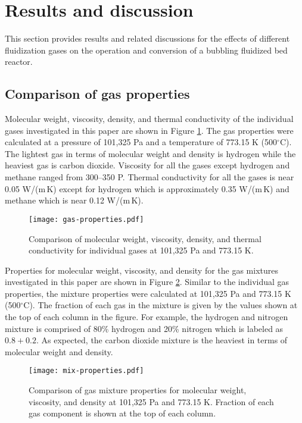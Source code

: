 
\section{Results and discussion}

This section provides results and related discussions for the effects of different fluidization gases on the operation and conversion of a bubbling fluidized bed reactor.

\subsection{Comparison of gas properties}

Molecular weight, viscosity, density, and thermal conductivity of the individual gases investigated in this paper are shown in Figure \ref{fig:gas-properties}. The gas properties were calculated at a pressure of 101,325 Pa and a temperature of 773.15 K (500$^\circ$C). The lightest gas in terms of molecular weight and density is hydrogen while the heaviest gas is carbon dioxide. Viscosity for all the gases except hydrogen and methane ranged from 300--350 \textmugreek P. Thermal conductivity for all the gases is near 0.05 W/(m\,K) except for hydrogen which is approximately 0.35 W/(m\,K) and methane which is near 0.12 W/(m\,K).

\begin{figure}[H]
    \centering
    \texttt{[image: gas-properties.pdf]}
    \caption{Comparison of molecular weight, viscosity, density, and thermal conductivity for individual gases at 101,325 Pa and 773.15 K.}
    \label{fig:gas-properties}
\end{figure}

Properties for molecular weight, viscosity, and density for the gas mixtures investigated in this paper are shown in Figure \ref{fig:mix-properties}. Similar to the individual gas properties, the mixture properties were calculated at 101,325 Pa and 773.15 K (500$^\circ$C). The fraction of each gas in the mixture is given by the values shown at the top of each column in the figure. For example, the hydrogen and nitrogen mixture is comprised of 80\% hydrogen and 20\% nitrogen which is labeled as $0.8 + 0.2$. As expected, the carbon dioxide mixture is the heaviest in terms of molecular weight and density.

\begin{figure}[H]
    \centering
    \texttt{[image: mix-properties.pdf]}
    \caption{Comparison of gas mixture properties for molecular weight, viscosity, and density at 101,325 Pa and 773.15 K. Fraction of each gas component is shown at the top of each column.}
    \label{fig:mix-properties}
\end{figure}

